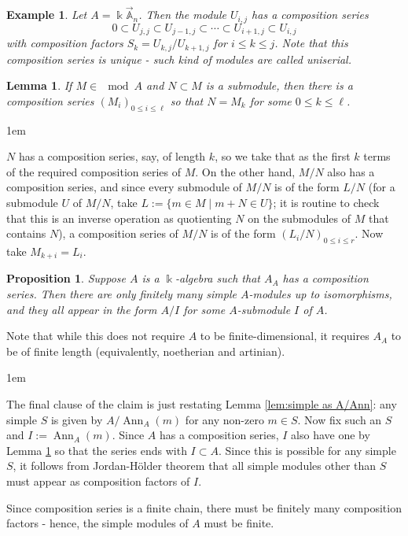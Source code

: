 \documentclass[11pt,a4paper]{article}
\makeatletter
\numberwithin{equation}{section}
\renewenvironment{proof}[1][\proofname]{\par
    \pushQED{\qed}%
    \normalfont \topsep0\p@\@plus6\p@ \labelsep1em\relax
    \trivlist
    \item[\hskip\labelsep\indent
        \bfseries #1]\ignorespaces
    \mbox{}
}{
    \popQED\endtrivlist\@endpefalse
}
\theoremstyle{all}
\newtheorem{proposition}[theorem]{Proposition}
\newtheorem{lemma}[theorem]{Lemma}
\newtheorem{example}[theorem]{Example}
\theoremstyle{remark}
\newcommand{\Ann}{\operatorname{Ann}\nolimits}
\newcommand{\linA}{\vec{\mathbb{A}}}
\newcommand{\defn}[1]{\textsl{\color{darkblue} #1}}
\makeatother
\begin{document}
\begin{example}
Let $A=\Bbbk \linA_n$.  Then the module $U_{i,j}$ has a composition series
\[
0 \subset U_{j,j} \subset U_{j-1,j} \subset \cdots \subset U_{i+1,j} \subset U_{i,j}
\]
with composition factors $S_{k} = U_{k,j}/U_{k+1,j}$ for $i\leq k \leq j$.
Note that this composition series is unique - such kind of modules are called \defn{uniserial}.
\end{example}

\begin{lemma}\label{lem:submod comp ser}
If $M\in \mod A$ and $N\subset M$ is a submodule, then there is a composition series $(M_i)_{0\leq i\leq \ell}$ so that $N=M_k$ for some $0\leq k\leq \ell$.
\end{lemma}
\begin{proof}
$N$ has a composition series, say, of length $k$, so we take that as the first $k$ terms of the required composition series of $M$.
On the other hand, $M/N$ also has a composition series, and since every submodule of $M/N$ is of the form $L/N$ (for a submodule $U$ of $M/N$, take $L:=\{m\in M\mid m+N\in U\}$; it is routine to check that this is an inverse operation as quotienting $N$ on the submodules of $M$ that contains $N$), a composition series of $M/N$ is of the form $(L_i/N)_{0\leq i\leq r}$.  Now take $M_{k+i} = L_i$.
\end{proof}

\begin{proposition}
Suppose $A$ is a $\Bbbk$-algebra such that $A_A$ has a composition series.
Then there are only finitely many simple $A$-modules up to isomorphisms, and they all appear in the form $A/I$ for some $A$-submodule $I$ of $A$.
\end{proposition}
Note that while this does not require $A$ to be finite-dimensional, it requires $A_A$ to be of finite length (equivalently, noetherian and artinian).
\begin{proof}
The final clause of the claim is just restating Lemma \ref{lem:simple as A/Ann}:  any simple $S$ is given by $A/\Ann_A(m)$ for any non-zero $m\in S$.
Now fix such an $S$ and $I:=\Ann_A(m)$.
Since $A$ has a composition series, $I$ also have one by Lemma \ref{lem:submod comp ser} so that the series ends with $I\subset A$.
Since this is possible for any simple $S$, it follows from Jordan-H\"{o}lder theorem that all simple modules other than $S$ must appear as composition factors of $I$.

Since composition series is a finite chain, there must be finitely many composition factors - hence, the simple modules of $A$ must be finite.
\end{proof}
\end{document}

